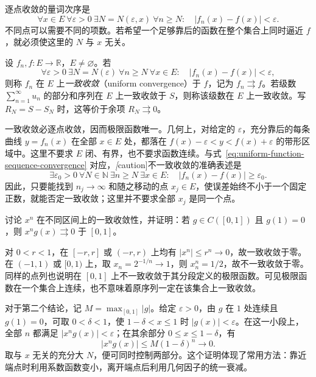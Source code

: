 逐点收敛的量词次序是
\[
    \forall x\in E\ \forall\varepsilon>0\ \exists N=N(\varepsilon,x)
    \ \forall n\geq N:\quad |f_n(x)-f(x)|<\varepsilon.
\]
不同点可以需要不同的项数。若希望一个足够靠后的函数在整个集合上同时逼近 $f$，就必须使这里的 $N$ 与 $x$ 无关。

\begin{definition}
\label{def:uniform-function-sequence-and-series-convergence}
设 $f_n,f:E\to\mathbb R$，$E\neq\varnothing$。若
\begin{equation}
    \forall\varepsilon>0\ \exists N=N(\varepsilon)\ \forall n\geq N
    \ \forall x\in E:\quad |f_n(x)-f(x)|<\varepsilon,
    \label{eq:uniform-function-sequence-convergence}
\end{equation}
则称 $f_n$ 在 $E$ 上\emph{一致收敛}（uniform convergence）于 $f$，记为 $f_n\rightrightarrows f$。若级数 $\sum_{n=1}^\infty u_n$ 的部分和序列在 $E$ 上一致收敛于 $S$，则称该级数在 $E$ 上一致收敛。写 $R_N=S-S_N$ 时，这等价于余项 $R_N\rightrightarrows0$。
\end{definition}

一致收敛必逐点收敛，因而极限函数唯一。几何上，对给定的 $\varepsilon$，充分靠后的每条曲线 $y=f_n(x)$ 在全部 $x\in E$ 处，都落在 $f(x)-\varepsilon<y<f(x)+\varepsilon$ 的带形区域中。这里不要求 $E$ 闭、有界，也不要求函数连续。与式~\eqref{eq:uniform-function-sequence-convergence} 对应，\emph[caution]{不一致收敛}的准确表述是
\begin{equation}
    \exists\varepsilon_0>0\ \forall N\in\mathbb N\ \exists n\geq N
    \ \exists x\in E:\quad |f_n(x)-f(x)|\geq\varepsilon_0.
    \label{eq:negation-of-uniform-function-convergence}
\end{equation}
因此，只要能找到 $n_j\to\infty$ 和随之移动的点 $x_j\in E$，使误差始终不小于一个固定正数，就能否定一致收敛；这里并不要求全部 $x_j$ 是同一个点。

\begin{example}
\label{ex:uniform-powers-and-endpoint-factor}
讨论 $x^n$ 在不同区间上的一致收敛性，并证明：若 $g\in C([0,1])$ 且 $g(1)=0$，则 $x^ng(x)\rightrightarrows0$ 于 $[0,1]$。
\end{example}

\begin{solve}
对 $0<r<1$，在 $[-r,r]$ 或 $(-r,r)$ 上均有 $|x^n|\leq r^n\to0$，故一致收敛于零。在 $(-1,1)$ 或 $[0,1)$ 上，取 $x_n=2^{-1/n}\to1$，则 $x_n^n=1/2$，故不一致收敛于零。同样的点列也说明在 $[0,1]$ 上不一致收敛于其分段定义的极限函数。可见极限函数在一个集合上连续，也不意味着原序列一定在该集合上一致收敛。

对于第二个结论，记 $M=\max_{[0,1]}|g|$。给定 $\varepsilon>0$，由 $g$ 在 $1$ 处连续且 $g(1)=0$，可取 $0<\delta<1$，使 $1-\delta<x\leq1$ 时 $|g(x)|<\varepsilon$。在这一小段上，全部 $n$ 都满足 $|x^ng(x)|<\varepsilon$；在其余部分 $0\leq x\leq1-\delta$，有
\[
    |x^ng(x)|\leq M(1-\delta)^n\longrightarrow0.
\]
取与 $x$ 无关的充分大 $N$，便可同时控制两部分。这个证明体现了常用方法：靠近端点时利用系数函数变小，离开端点后利用几何因子的统一衰减。
\end{solve}

